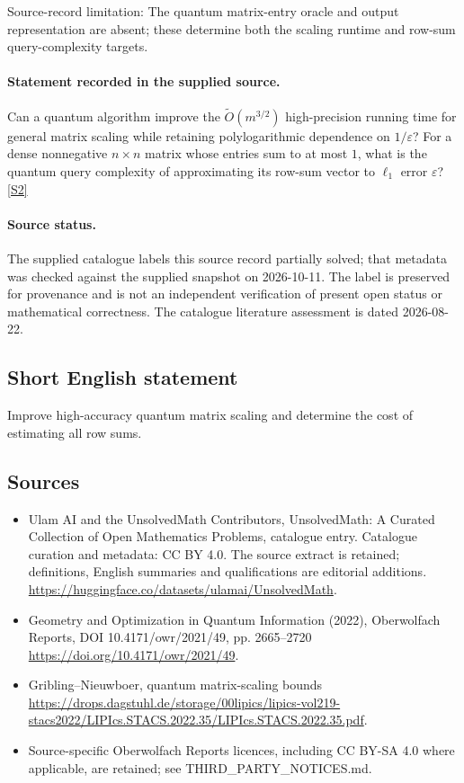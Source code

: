 \documentclass[11pt]{article}
\begin{document}
Source-record limitation: The quantum matrix-entry oracle and output representation are absent; these determine both the scaling runtime and row-sum query-complexity targets.
\paragraph{Statement recorded in the supplied source.}
Can a quantum algorithm improve the $\widetilde O(m^{3/2})$ high-precision running time for general matrix scaling while retaining polylogarithmic dependence on $1/\varepsilon$? For a dense nonnegative $n\times n$ matrix whose entries sum to at most $1$, what is the quantum query complexity of approximating its row-sum vector to $\ell_1$ error $\varepsilon$? \href{https://doi.org/10.4171/owr/2021/49}{[S2]}
\paragraph{Source status.}
The supplied catalogue labels this source record partially solved; that metadata was checked against the supplied snapshot on 2026-10-11. The label is preserved for provenance and is not an independent verification of present open status or mathematical correctness. The catalogue literature assessment is dated 2026-08-22.
\subsection{Short English statement}
Improve high-accuracy quantum matrix scaling and determine the cost of estimating all row sums.
\subsection{Sources}
\begin{itemize}
\item[S1] Ulam AI and the UnsolvedMath Contributors, UnsolvedMath: A Curated Collection of Open Mathematics Problems, catalogue entry. Catalogue curation and metadata: CC BY 4.0. The source extract is retained; definitions, English summaries and qualifications are editorial additions.
\url{https://huggingface.co/datasets/ulamai/UnsolvedMath}.
\item[S2] Geometry and Optimization in Quantum Information (2022), Oberwolfach Reports, DOI 10.4171/owr/2021/49, pp. 2665--2720
\url{https://doi.org/10.4171/owr/2021/49}.
\item[S3] Gribling--Nieuwboer, quantum matrix-scaling bounds
\url{https://drops.dagstuhl.de/storage/00lipics/lipics-vol219-stacs2022/LIPIcs.STACS.2022.35/LIPIcs.STACS.2022.35.pdf}.
\item Source-specific Oberwolfach Reports licences, including CC BY-SA 4.0 where applicable, are retained; see THIRD\_PARTY\_NOTICES.md.
\end{itemize}
\end{document}

